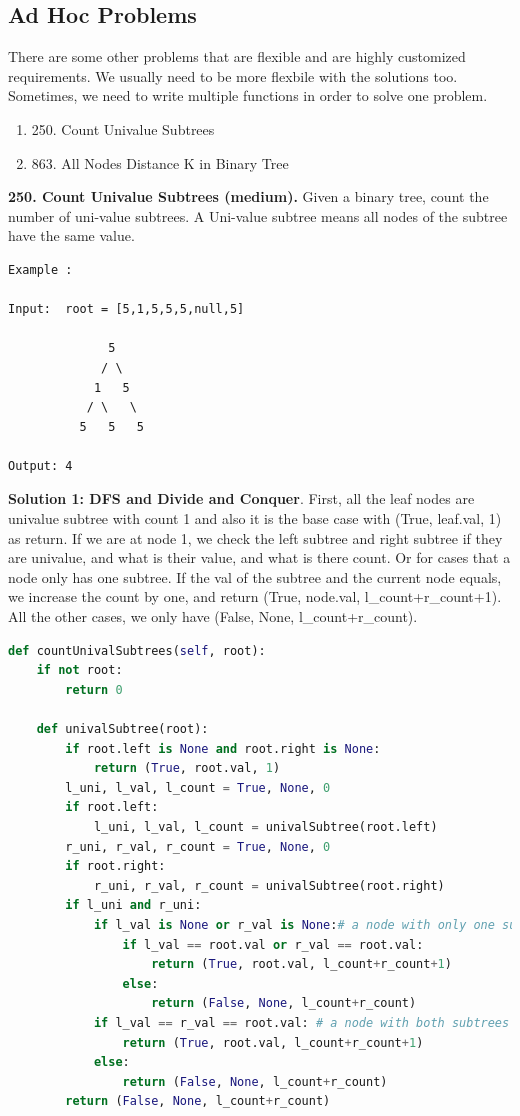 \documentclass[../main.tex]{subfiles}
\begin{document}
\subsection{Ad Hoc Problems}
There are some other problems that are flexible and are highly customized requirements. We usually need to be more flexbile with the solutions too. Sometimes, we need to write multiple functions in order to solve one problem. 
\begin{enumerate}
    \item 250. Count Univalue Subtrees
    \item 863. All Nodes Distance K in Binary Tree
\end{enumerate}
\begin{examples}[resume]
\item \textbf{250. Count Univalue Subtrees (medium). } Given a binary tree, count the number of uni-value subtrees. A Uni-value subtree means all nodes of the subtree have the same value.
\begin{lstlisting}[numbers=none]
Example :

Input:  root = [5,1,5,5,5,null,5]

              5
             / \
            1   5
           / \   \
          5   5   5

Output: 4
\end{lstlisting}
\textbf{Solution 1: DFS and Divide and Conquer}. First, all the leaf nodes are univalue subtree with count 1 and also it is the base case with (True, leaf.val, 1) as return. If we are at node 1, we check the left subtree and right subtree if they are univalue, and what is their value, and what is there count. Or for cases that a node only has one subtree. If the val of the subtree and the current node equals, we increase the count by one, and return (True, node.val, l\_count+r\_count+1). All the other cases, we only have (False, None, l\_count+r\_count). 
\begin{lstlisting}[language = Python]
def countUnivalSubtrees(self, root):
    if not root:
        return 0

    def univalSubtree(root):
        if root.left is None and root.right is None:
            return (True, root.val, 1)
        l_uni, l_val, l_count = True, None, 0
        if root.left:
            l_uni, l_val, l_count = univalSubtree(root.left)
        r_uni, r_val, r_count = True, None, 0
        if root.right:
            r_uni, r_val, r_count = univalSubtree(root.right)
        if l_uni and r_uni:
            if l_val is None or r_val is None:# a node with only one subtree
                if l_val == root.val or r_val == root.val:
                    return (True, root.val, l_count+r_count+1)
                else:
                    return (False, None, l_count+r_count)
            if l_val == r_val == root.val: # a node with both subtrees
                return (True, root.val, l_count+r_count+1)
            else:
                return (False, None, l_count+r_count)
        return (False, None, l_count+r_count)
        

\end{lstlisting}
\end{examples}
\end{document}
